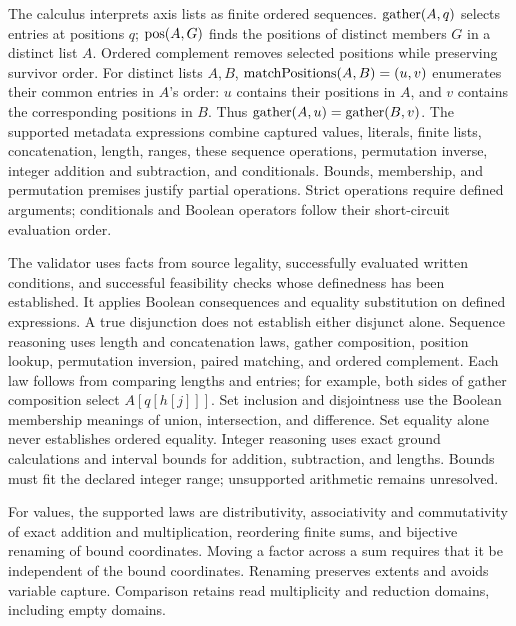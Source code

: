 The calculus interprets axis lists as finite ordered sequences.
$\operatorname{gather}(A,q)$ selects entries at positions $q$; $\operatorname{pos}(A,G)$ finds the
positions of distinct members $G$ in a distinct list $A$. Ordered
complement removes selected positions while preserving survivor order.
For distinct lists $A,B$, $\operatorname{matchPositions}(A,B)=(u,v)$ enumerates their common entries
in $A$'s order: $u$ contains their positions in $A$, and $v$ contains the
corresponding positions in $B$. Thus $\operatorname{gather}(A,u)=\operatorname{gather}(B,v)$.
The supported metadata expressions combine captured values, literals,
finite lists, concatenation, length, ranges, these sequence operations,
permutation inverse, integer addition and subtraction, and conditionals.
Bounds, membership, and permutation premises justify partial operations.
Strict operations require defined arguments; conditionals and Boolean
operators follow their short-circuit evaluation order.

The validator uses facts from source legality, successfully evaluated
written conditions, and successful feasibility checks whose definedness
has been established. It
applies Boolean consequences and equality substitution on defined
expressions. A true disjunction does not establish either disjunct alone.
Sequence reasoning uses length and concatenation laws, gather composition,
position lookup, permutation inversion, paired matching, and ordered
complement. Each law follows from comparing lengths and entries; for
example, both sides of gather composition select $A[q[h[j]]]$.
Set inclusion and disjointness use the Boolean membership meanings of
union, intersection, and difference. Set equality alone never establishes
ordered equality. Integer reasoning uses exact ground calculations and
interval bounds for addition, subtraction, and lengths. Bounds must fit
the declared integer range; unsupported arithmetic remains unresolved.

For values, the supported laws are distributivity, associativity and
commutativity of exact addition and multiplication, reordering finite
sums, and bijective renaming of bound coordinates. Moving a factor across
a sum requires that it be independent of the bound coordinates. Renaming
preserves extents and avoids variable capture. Comparison retains read
multiplicity and reduction domains, including empty domains.

